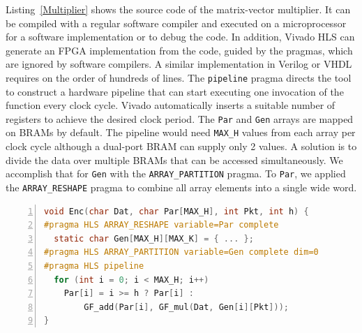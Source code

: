 Listing~\ref{Multiplier} shows the source code of the
matrix-vector multiplier. %
It can be compiled with a regular software
compiler and executed on a microprocessor
for a software implementation or to debug the code.
In addition, Vivado HLS can generate an FPGA implementation
from the code, guided by the pragmas, which are ignored by software compilers.
A similar implementation in Verilog or VHDL requires on the order of hundreds
of lines.  The {\tt pipeline} pragma directs the tool to construct a
hardware pipeline that can start executing one invocation of the function
every clock cycle.  Vivado automatically inserts a suitable number of registers
to achieve the desired clock period.  The {\tt Par} and {\tt Gen} arrays are mapped
on BRAMs by default.  The pipeline would need {\tt MAX\_H} values from each
array per clock cycle although a dual-port BRAM can supply only 2 values.
A solution is to divide the data over multiple BRAMs that can be
accessed simultaneously.  We accomplish that for {\tt Gen} with the {\tt ARRAY\_PARTITION}
pragma.  To {\tt Par}, we applied the {\tt ARRAY\_RESHAPE} pragma to combine
all array elements into a single wide word.

\begin{lstlisting}[language=C,basicstyle=\footnotesize,numbers=left,
                   captionpos=b,caption={Matrix-Vector Multiplier},
                   label=Multiplier]
void Enc(char Dat, char Par[MAX_H], int Pkt, int h) {
#pragma HLS ARRAY_RESHAPE variable=Par complete
  static char Gen[MAX_H][MAX_K] = { ... };
#pragma HLS ARRAY_PARTITION variable=Gen complete dim=0
#pragma HLS pipeline
  for (int i = 0; i < MAX_H; i++)
    Par[i] = i >= h ? Par[i] :
        GF_add(Par[i], GF_mul(Dat, Gen[i][Pkt]));
}
\end{lstlisting}

